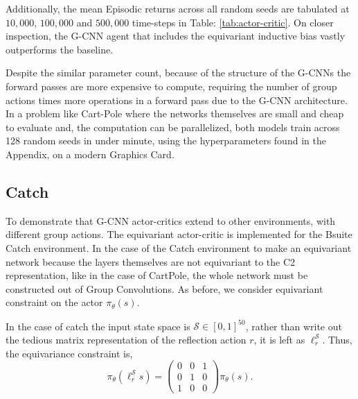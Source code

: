 Additionally, the mean Episodic returns across all random seeds are tabulated at $10,000$, $100,000$ and $500,000$ time-steps in Table: \ref{tab:actor-critic}. On closer inspection, the G-CNN agent that includes the equivariant inductive bias vastly outperforms the baseline.

Despite the similar parameter count, because of the structure of the G-CNNs the forward passes are more expensive to compute, requiring the number of group actions times more operations in a forward pass due to the G-CNN architecture. In a problem like Cart-Pole where the networks themselves are small and cheap to evaluate and, the computation can be parallelized, both models train across 128 random seeds in under minute, using the hyperparameters found in the Appendix, on a modern Graphics Card.

\subsection{Catch}
To demonstrate that G-CNN actor-critics extend to other environments, with different group actions. The equivariant actor-critic is implemented for the Bsuite Catch environment. In the case of the Catch environment to make an equivariant network because the layers themselves are not equivariant to the C2 representation, like in the case of CartPole, the whole network must be constructed out of Group Convolutions. As before, we consider equivariant constraint on the actor $\pi_\theta(s)$.

In the case of catch the input state space is $\mathcal{S} \in [0, 1]^{50}$, rather than write out the tedious matrix representation of the reflection action $r$, it is left as $\ell_r^\mathcal{S}$. Thus, the equivariance constraint is,
\begin{equation}
	\pi_\theta(\ell_r^\mathcal{S} s) = \begin{pmatrix}
		0 & 0 & 1 \\
		0 & 1 & 0 \\
		1 & 0 & 0
	\end{pmatrix}\pi_\theta(s).
\end{equation}

